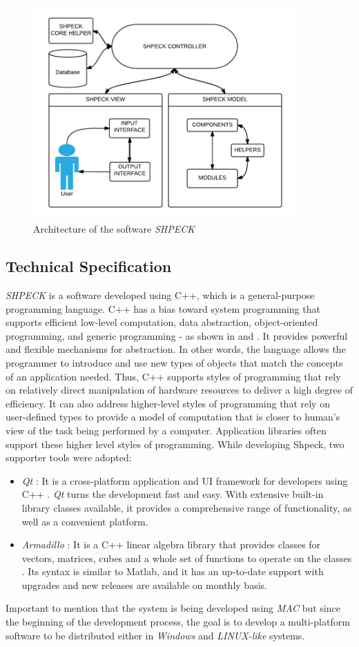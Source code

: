 \begin{figure}[ht!]
\centering
\includegraphics[width=100mm]{figures/shpeck-architecture.png}
\caption{Architecture of the software \emph{SHPECK}}
\label{fig:shpeck-architecture}
\end{figure}

\subsection{Technical Specification}
\emph{SHPECK} is a software developed using C++, which is a general-purpose programming language. C++ has a bias toward system programming that supports efficient low-level computation, data abstraction, object-oriented programming, and generic programming - as shown in \cite{Dale:04} and \cite{Stroustrup:97}. It provides powerful and flexible mechanisms for abstraction. In other words, the language allows the programmer to introduce and use new types of objects that match the concepts of an application needed. Thus, C++ supports styles of programming that rely on relatively direct manipulation of hardware resources to deliver a high degree of efficiency. It can also address higher-level styles of programming that rely on user-defined types to provide a model of computation that is closer to human's view of the task being performed by a computer. Application libraries often support these higher level styles of programming. While developing Shpeck, two supporter tools were adopted:
\begin{itemize}
\item \emph{Qt} : It is a cross-platform application and UI framework for developers using C++  \cite{Qt:14}. \emph{Qt} turns the development fast and easy. With extensive built-in library classes available, it provides a comprehensive range of functionality, as well as a convenient platform.
\item \emph{Armadillo} : It is a C++ linear algebra library that provides classes for vectors, matrices, cubes and a whole set of functions to operate on the classes \cite{arma:14}. Its syntax is similar to Matlab, and it has an up-to-date support with upgrades and new releases are available on monthly basis.
\end{itemize}
Important to mention that the system is being developed using \emph{MAC} but since the beginning of the development process, the goal is to develop a multi-platform software to be distributed either in \emph{Windows} and \emph{LINUX-like} systems.

